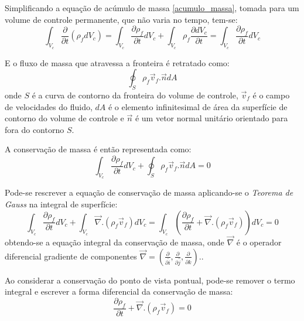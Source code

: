 Simplificando a equação de acúmulo de massa \eqref{acumulo_massa}, tomada para um volume de controle permanente, que não varia no tempo, tem-se:
\begin{equation}
    \int_{V_c}\dfrac{\partial}{\partial t} (\rho_f d V_c) = \int_{V_c}\dfrac{\partial \rho_f}{\partial t} d V_c + \int_{V_c} \rho_f \dfrac{\partial d V_c}{\partial t} = \int_{V_c}\dfrac{\partial \rho_f}{\partial t} d V_c
    \label{acumulo_massa_simp}
\end{equation}

E o fluxo de massa que atravessa a fronteira é retratado como:
\begin{equation}
    \oint_{S}\rho_f \vec{v}_f.\vec{n} dA
    \label{fluxo_massa}
\end{equation}
onde $S$ é a curva de contorno da fronteira do volume de controle, $\vec{v}_f$ é o campo de velocidades do fluido, $dA$ é o elemento infinitesimal de área da superfície de contorno do volume de controle e $\vec{n}$ é um vetor normal unitário orientado para fora do contorno $S$.

A conservação de massa é então representada como:
\begin{equation}
    \int_{V_c}\dfrac{\partial \rho_f}{\partial t} d V_c + \oint_{S}\rho_f \vec{v}_f.\vec{n} dA = 0
    \label{cons_mass}
\end{equation}

Pode-se rescrever a equação de conservação de massa aplicando-se o \textit{Teorema de Gauss}\cite{pontes_norberto} na integral de superfície:
\begin{equation}
    \int_{V_c}\dfrac{\partial \rho_f}{\partial t} d V_c + \int_{V_c}\vec{\nabla}.(\rho_f \vec{v}_f) d V_c = 
    \int_{V_c}\left(\dfrac{\partial \rho_f}{\partial t} + \vec{\nabla}.(\rho_f \vec{v}_f) \right)d V_c = 0
    \label{cons_mass_int}
\end{equation}
obtendo-se a equação integral da conservação de massa, onde $\vec{\nabla}$ é o operador diferencial gradiente de componentes $\vec{\nabla}=\left(\tfrac{\partial}{\partial \hat{i}}, \tfrac{\partial}{\partial \hat{j}}, \tfrac{\partial}{\partial \hat{k}}\right)$..

Ao considerar a conservação do ponto de vista pontual, pode-se remover o termo integral e escrever a forma diferencial da conservação de massa:
\begin{equation}
    \dfrac{\partial \rho_f}{\partial t} + \vec{\nabla}.(\rho_f \vec{v}_f) = 0
    \label{cons_mass_dif}
\end{equation}


